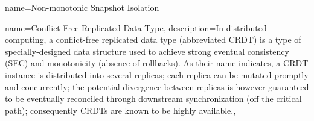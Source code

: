  {
    name={Non-monotonic Snapshot Isolation}
}

 {
  name={Conflict-Free Replicated Data Type},
  description={In distributed computing, a conflict-free replicated data type (abbreviated CRDT) is a type of specially-designed data structure used to achieve strong eventual consistency (SEC) and monotonicity (absence of rollbacks). As their name indicates, a CRDT instance is distributed into several replicas; each replica can be mutated promptly and concurrently; the potential divergence between replicas is however guaranteed to be eventually reconciled through downstream synchronization (off the critical path); consequently CRDTs are known to be highly available.},
}



